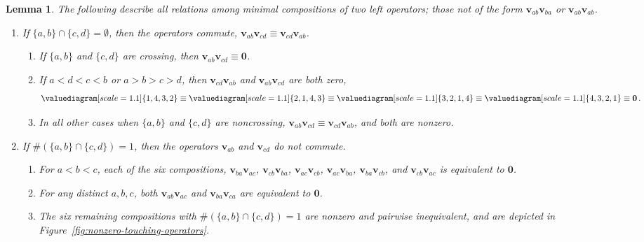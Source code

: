 \documentclass[12pt,oneside,reqno]{amsart}
\newtheorem{lemma}[theorem]{Lemma}
\theoremstyle{definition}
\numberwithin{equation}{section}
\newcommand{\qv}{{\mathbf v}}
\newcommand{\bzero}{{\mathbf 0}}
\begin{document}
\begin{lemma}\label{Lem:Rel}
 The following describe all relations among minimal compositions of two left operators; those not of the form $\qv_{ab} \qv_{ba}$ or
 $\qv_{ab} \qv_{ab}$. 
 \begin{enumerate}
   \item If $\{a,b\}\cap\{c,d\}=\emptyset$, then the operators commute,  ${\qv}_{ab}{\qv}_{cd} \equiv {\qv}_{cd}{\qv}_{ab}$.
      \begin{enumerate}[itemsep=1ex, topsep=1ex, label=(\roman*)]
   
      \item \label{Rel:1:i}
        If $\{a,b\}$ and $\{c,d\}$  are crossing, then $\qv_{ab}\qv_{cd}  \equiv \bzero$.

      \item  \label{Rel:1:ii}
        If  $a<d<c<b$ or $a>b>c>d$, then  $\qv_{cd}\qv_{ab}$ and $\qv_{ab}\qv_{cd}$ are both zero,
          \[
             \valuediagram[scale=1.1]{{1,4},{3,2}}\equiv
             \valuediagram[scale=1.1]{{2,1},{4,3}}\equiv
             \valuediagram[scale=1.1]{{3,2},{1,4}}\equiv
             \valuediagram[scale=1.1]{{4,3},{2,1}}\equiv \bzero\,.
          \]        
  
        \item  \label{Rel:1:iii}
          In all other cases when $\{a,b\}$ and $\{c,d\}$ are noncrossing, $\qv_{ab}\qv_{cd}\equiv\qv_{cd}\qv_{ab}$, 
         and both are  nonzero.
     \end{enumerate}
        
   \item If $\#(\{a,b\}\cap\{c,d\})=1$, then the operators $\qv_{ab}$ and $\qv_{cd}$ do not commute.
     \begin{enumerate}[itemsep=1ex, topsep=1ex, label=(\roman*)]

     \item  \label{Rel:2:i}
       For $a<b<c$, each of the six compositions,
       $\qv_{ba}\qv_{ac}$,   $\qv_{cb}\qv_{ba}$,   $\qv_{ac}\qv_{cb}$,   $\qv_{ac}\qv_{ba}$,   $\qv_{ba}\qv_{cb}$, and  $\qv_{cb}\qv_{ac}$
       is equivalent to $\bzero$.

     \item   \label{Rel:2:ii}
       For any distinct $a,b,c$, both $\qv_{ab}\qv_{ac}$ and $\qv_{ba}\qv_{ca}$ are  equivalent to $\bzero$.

     \item  \label{Rel:2:iii}
       The six remaining compositions with  $\#(\{a,b\}\cap\{c,d\})=1$ are nonzero and pairwise inequivalent, and are
         depicted in Figure~\ref{fig:nonzero-touching-operators}.
     \end{enumerate}
  \end{enumerate}
\end{lemma}
\end{document}
